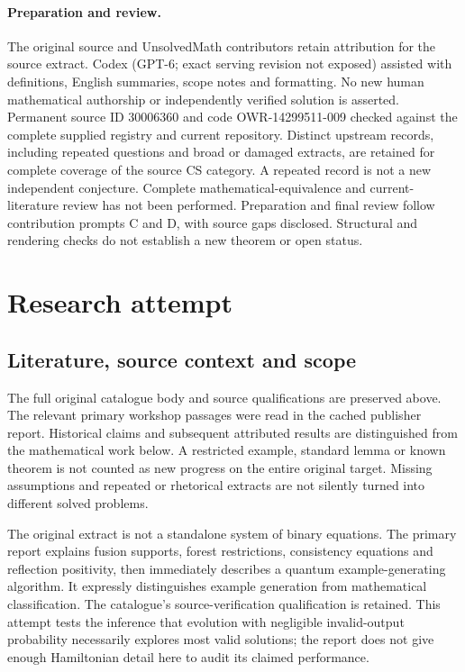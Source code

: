 \documentclass[11pt]{article}
\begin{document}
\paragraph{Preparation and review.}
The original source and UnsolvedMath contributors retain attribution for the source extract. Codex (GPT-6; exact serving revision not exposed) assisted with definitions, English summaries, scope notes and formatting. No new human mathematical authorship or independently verified solution is asserted. Permanent source ID 30006360 and code OWR-14299511-009 checked against the complete supplied registry and current repository. Distinct upstream records, including repeated questions and broad or damaged extracts, are retained for complete coverage of the source CS category. A repeated record is not a new independent conjecture. Complete mathematical-equivalence and current-literature review has not been performed. Preparation and final review follow contribution prompts C and D, with source gaps disclosed. Structural and rendering checks do not establish a new theorem or open status.
\label{end:30006360}

\section{Research attempt}
\subsection{Literature, source context and scope}
The full original catalogue body and source qualifications are preserved above. The relevant primary workshop passages were read in the cached publisher report. Historical claims and subsequent attributed results are distinguished from the mathematical work below. A restricted example, standard lemma or known theorem is not counted as new progress on the entire original target. Missing assumptions and repeated or rhetorical extracts are not silently turned into different solved problems.

The original extract is not a standalone system of binary equations. The primary report explains fusion supports, forest restrictions, consistency equations and reflection positivity, then immediately describes a quantum example-generating algorithm. It expressly distinguishes example generation from mathematical classification. The catalogue's source-verification qualification is retained. This attempt tests the inference that evolution with negligible invalid-output probability necessarily explores most valid solutions; the report does not give enough Hamiltonian detail here to audit its claimed performance.
\end{document}
